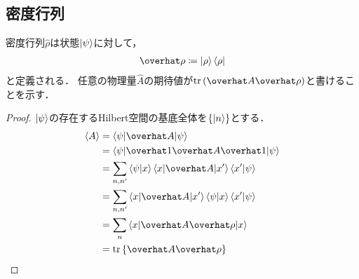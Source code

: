 \documentclass{report}
\begin{document}
  \subsection{密度行列}
    密度行列$\hat{\rho}$は状態$\ket{\psi}$に対して，
    \begin{align}
      \hat{\rho} \coloneqq \ket{\rho}\bra{\rho}
    \end{align}
    と定義される．
    任意の物理量$\hat{A}$の期待値が$\tr\qty(\hat{A}\hat{\rho})$と書けることを示す．
    \begin{proof}
      $\ket{\psi}$の存在するHilbert空間の基底全体を$\qty{\ket{n}}$とする．
      \begin{align}
        \ev{A} &= \mel**{\psi}{\hat{A}}{\psi} \\ 
        &= \mel**{\psi}{\hat{1}\hat{A}\hat{1}}{\psi} \\ 
        &= \sum_{n, n'} \braket{\psi}{x}\mel**{x}{\hat{A}}{x'}\braket{x'}{\psi} \\ 
        &= \sum_{n, n'} \mel**{x}{\hat{A}}{x'} \braket{\psi}{x}\braket{x'}{\psi} \\ 
        &= \sum_{n} \mel**{x}{\hat{A}\hat{\rho}}{x} \\ 
        &= \tr\qty{\hat{A}\hat{\rho}}\label{expatation-value-density-matrix}
      \end{align}
    \end{proof}
\end{document}
